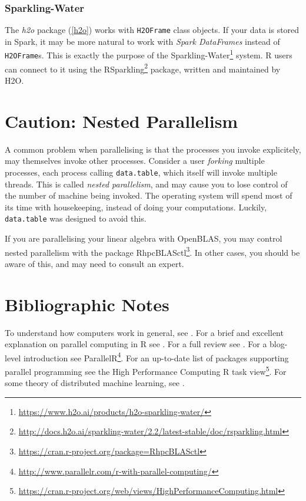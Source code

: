 \documentclass[]{book}
\renewcommand{\href}[2]{#2\footnote{\url{#1}}}
\theoremstyle{definition}
\theoremstyle{definition}
\theoremstyle{definition}
\theoremstyle{remark}
\begin{document}
\hypertarget{sparkling}{%
\subsubsection{Sparkling-Water}\label{sparkling}}

The \emph{h2o} package (\ref{h2o}) works with \texttt{H2OFrame} class objects.
If your data is stored in Spark, it may be more natural to work with \emph{Spark DataFrames} instead of \texttt{H2OFrame}s.
This is exactly the purpose of the \href{https://www.h2o.ai/products/h2o-sparkling-water/}{Sparkling-Water} system.
R users can connect to it using the \href{http://docs.h2o.ai/sparkling-water/2.2/latest-stable/doc/rsparkling.html}{RSparkling} package, written and maintained by H2O.

\hypertarget{nested-parallel}{%
\section{Caution: Nested Parallelism}\label{nested-parallel}}

A common problem when parallelising is that the processes you invoke explicitely, may themselves invoke other processes.
Consider a user \emph{forking} multiple processes, each process calling \texttt{data.table}, which itself will invoke multiple threads.
This is called \emph{nested parallelism}, and may cause you to lose control of the number of machine being invoked.
The operating system will spend most of its time with housekeeping, instead of doing your computations.
Luckily, \texttt{data.table} was designed to avoid this.

If you are parallelising your linear algebra with OpenBLAS, you may control nested parallelism with the package \href{https://cran.r-project.org/package=RhpcBLASctl}{RhpcBLASctl}.
In other cases, you should be aware of this, and may need to consult an expert.

\hypertarget{bibliographic-notes-14}{%
\section{Bibliographic Notes}\label{bibliographic-notes-14}}

To understand how computers work in general, see \citet{bryant2015computer}.
For a brief and excellent explanation on parallel computing in R see \citet{schmidberger2009state}.
For a full review see \citet{chapple2016mastering}.
For a blog-level introduction see \href{http://www.parallelr.com/r-with-parallel-computing/}{ParallelR}.
For an up-to-date list of packages supporting parallel programming see the High Performance Computing \href{https://cran.r-project.org/web/views/HighPerformanceComputing.html}{R task view}.
For some theory of distributed machine learning, see \citet{rosenblatt2016optimality}.
\end{document}
